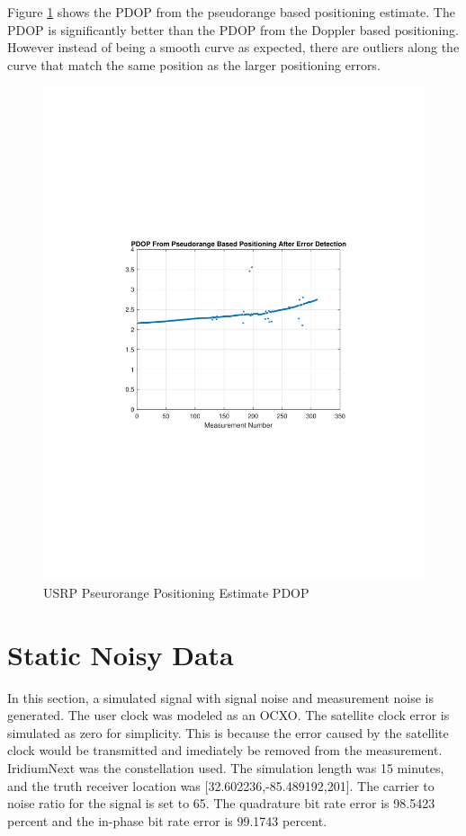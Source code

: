 \documentclass[12pt]{report}
\begin{document}
Figure \ref{fig:USRPpseudo15minIridPositpdop} shows the PDOP from the pseudorange based positioning estimate. The PDOP is significantly better than the PDOP from the Doppler based positioning. However instead of being a smooth curve as expected, there are outliers along the curve that match the same position as the larger positioning errors. 
\begin{figure}[h!]
    \centering
    \includegraphics[trim=1.2in 3.3in 1.75in 3.3in,clip,width=5in]
    {Irid_15min_USRP_PseudoPDOP.pdf}
    \caption{USRP Pseurorange Positioning Estimate PDOP}
    \label{fig:USRPpseudo15minIridPositpdop}
\end{figure}

\section{Static Noisy Data}
In this section, a simulated signal with signal noise and measurement noise is generated. The user clock was modeled as an OCXO. The satellite clock error is simulated as zero for simplicity. This is because the error caused by the satellite clock would be transmitted and imediately be removed from the measurement. IridiumNext was the constellation used. The simulation length was 15 minutes, and the truth receiver location was [32.602236,-85.489192,201]. The carrier to noise ratio for the signal is set to 65. The quadrature bit rate error is 98.5423 percent and the in-phase bit rate error is 99.1743 percent. 
\end{document}
